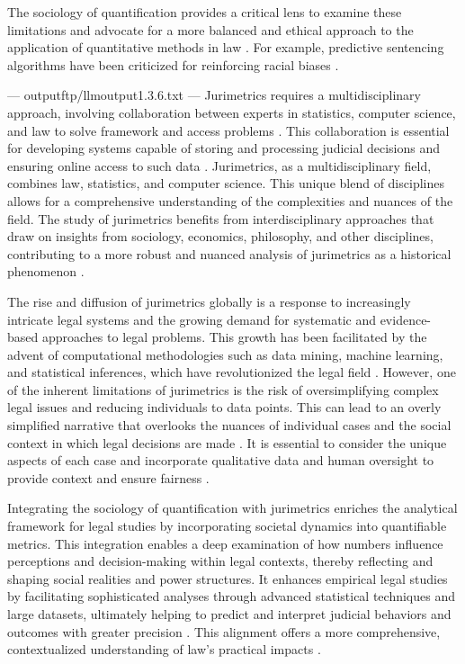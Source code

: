 The sociology of quantification provides a critical lens to examine these limitations and advocate for a more balanced and ethical approach to the application of quantitative methods in law \cite{10.1057/s41599-020-00557-0,10.1590/dados.2022.65.3.267}. For example, predictive sentencing algorithms have been criticized for reinforcing racial biases \cite{10.1057/s41599-020-00557-0}.


---
outputftp/llmoutput1.3.6.txt
---
Jurimetrics requires a multidisciplinary approach, involving collaboration between experts in statistics, computer science, and law to solve framework and access problems \cite{103390fi9040068}. This collaboration is essential for developing systems capable of storing and processing judicial decisions and ensuring online access to such data \cite{103390fi9040068}. Jurimetrics, as a multidisciplinary field, combines law, statistics, and computer science. This unique blend of disciplines allows for a comprehensive understanding of the complexities and nuances of the field. The study of jurimetrics benefits from interdisciplinary approaches that draw on insights from sociology, economics, philosophy, and other disciplines, contributing to a more robust and nuanced analysis of jurimetrics as a historical phenomenon \cite{1023071190721}.

The rise and diffusion of jurimetrics globally is a response to increasingly intricate legal systems and the growing demand for systematic and evidence-based approaches to legal problems. This growth has been facilitated by the advent of computational methodologies such as data mining, machine learning, and statistical inferences, which have revolutionized the legal field \cite{10.1017/s0003975609000150,10.5040/9781350220645,zabala2019decades,1023071190721,10.1515/9781400829699,10.1111/ilr.12067}. However, one of the inherent limitations of jurimetrics is the risk of oversimplifying complex legal issues and reducing individuals to data points. This can lead to an overly simplified narrative that overlooks the nuances of individual cases and the social context in which legal decisions are made \cite{10.1007/s11186-021-09453-1,10.1057/s41599-020-00557-0}. It is essential to consider the unique aspects of each case and incorporate qualitative data and human oversight to provide context and ensure fairness \cite{10.1007/s11186-021-09453-1,10.1057/s41599-020-00557-0}.

Integrating the sociology of quantification with jurimetrics enriches the analytical framework for legal studies by incorporating societal dynamics into quantifiable metrics. This integration enables a deep examination of how numbers influence perceptions and decision-making within legal contexts, thereby reflecting and shaping social realities and power structures. It enhances empirical legal studies by facilitating sophisticated analyses through advanced statistical techniques and large datasets, ultimately helping to predict and interpret judicial behaviors and outcomes with greater precision \cite{paiva2021, nunes2016, nunes2016}. This alignment offers a more comprehensive, contextualized understanding of law's practical impacts \cite{nunes2016}.

